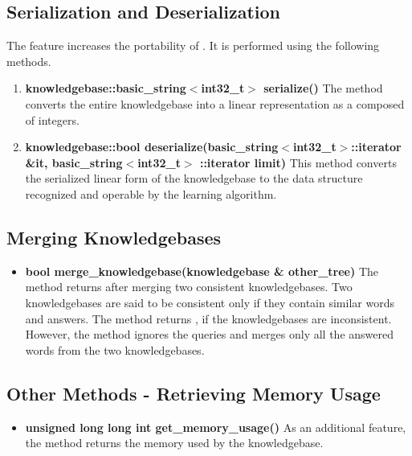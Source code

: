 \subsection*{Serialization and Deserialization}
The feature increases the portability of \libalf. It is performed using the following methods.
	
\begin{enumerate}
\item \textbf{knowledgebase::basic\_string$<$int32\_t$>$ serialize()} \vskip 1pt
The method converts the entire knowledgebase into a linear representation as a \stringtype composed of integers.

\item \textbf{knowledgebase::bool deserialize(basic\_string$<$int32\_t$>$::iterator \&it, basic\_string$<$int32\_t$>$ ::iterator limit)} \vskip 1pt
This method converts the serialized linear form of the knowledgebase to the data structure recognized and operable by the learning algorithm.
\end{enumerate}	
	
\subsection*{Merging Knowledgebases}

\begin{itemize}

  \item \textbf{bool merge\_knowledgebase(knowledgebase \& other\_tree)} \vskip 1pt
  The method returns \true after merging two consistent knowledgebases. Two knowledgebases are said to be consistent only if they contain similar words and answers. The method returns \false, if the knowledgebases are inconsistent.\\
  However, the method ignores the queries and merges only all the answered words from the two knowledgebases.

\end{itemize}
 
\subsection*{Other Methods - Retrieving Memory Usage}

\begin{itemize}
  \item \textbf{unsigned long long int get\_memory\_usage()} \vskip 1pt
  As an additional feature, the method returns the memory used by the knowledgebase. 
\end{itemize}

